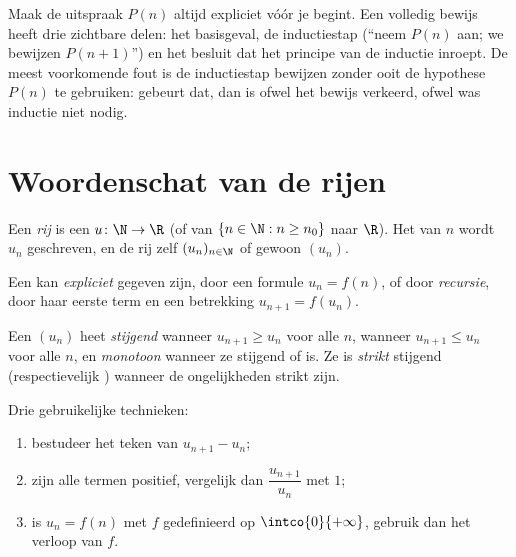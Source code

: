 \begin{method}\label{met:g12:seq:induction}
Maak de uitspraak $P(n)$ altijd expliciet vóór je begint. Een volledig bewijs
heeft drie zichtbare delen: het basisgeval, de inductiestap (``neem $P(n)$
aan; we bewijzen $P(n+1)$'') en het besluit dat het principe van de inductie
inroept. De meest voorkomende fout is de inductiestap bewijzen zonder ooit de
hypothese $P(n)$ te gebruiken: gebeurt dat, dan is ofwel het bewijs verkeerd,
ofwel was inductie niet nodig.
\end{method}

\section{Woordenschat van de rijen}

\begin{definition}[Rij]\label{def:g12:seq:sequence}
Een \emph{rij} is een  $u \colon \N \to \R$ (of van
$\{n \in \N : n \geq n_0\}$ naar $\R$). Het  van $n$ wordt $u_n$
geschreven, en de rij zelf $(u_n)_{n\in\N}$ of gewoon $(u_n)$.
\end{definition}

Een  kan \emph{expliciet} gegeven zijn, door een formule $u_n = f(n)$, of
door \emph{recursie}, door haar eerste term en een betrekking
$u_{n+1} = f(u_n)$.

\begin{definition}[Monotonie]\label{def:g12:seq:monotonic}
Een  $(u_n)$ heet \emph{stijgend} wanneer
$u_{n+1} \geq u_n$ voor alle $n$, \emph{} wanneer $u_{n+1} \leq u_n$
voor alle $n$, en \emph{monotoon} wanneer ze stijgend of  is. Ze is
\emph{strikt} stijgend (respectievelijk ) wanneer de ongelijkheden
strikt zijn.
\end{definition}

\begin{method}\label{met:g12:seq:monotonicity}
Drie gebruikelijke technieken:
\begin{enumerate}
  \item bestudeer het teken van $u_{n+1} - u_n$;
  \item zijn alle termen positief, vergelijk dan $\dfrac{u_{n+1}}{u_n}$ met
        $1$;
  \item is $u_n = f(n)$ met $f$ gedefinieerd op $\intco{0}{+\infty}$, gebruik
        dan het verloop van $f$.
\end{enumerate}
\end{method}

